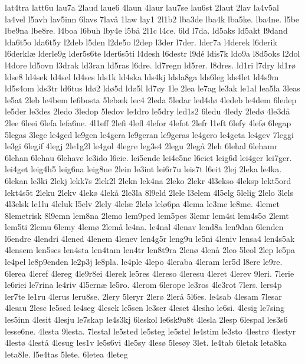 {lat4tra
latt6u
lau7a
2laud
laue6
4laun
4laur
lau7se
lau6st
2laut
2lav
la4v5al
la4vel
l5avh
lav5inn
6lavs
7lav^^e5
1law
lay1
2l1b2
lba3de
lba4k
lba5ke.
lba4ne.
l5be
lbe9na
lbe8re.
l4boa
l6buh
lby4e
l5b^^e5
2l1c
l4ce.
6ld
l7da.
ld5aks
ld5akt
l9dand
lda6t5o
lda6t5y
l2deb
l5den
l2de5o
l2dep
l3der
l7der.
lder7a
l4derek
l6derik
l6derkl^^e6
lderle9g
lder5s6te
lder6s5ti
l4desh
l6destr
l9d^^e9
ldis7k
ldo9a
l8d5oks
l2dol
l4dore
ld5ovn
l3drak
ld3ran
ld5ras
l6dre.
ld7regn
ld5rer.
l8dres.
ld1ri
l7dry
ld1r^^f8
ldse8
ld4sek
ld4sel
ld4ses
lds1k
ld4ska
lds4kj
ldsla8ga
lds6leg
lds4let
ld4s9m
ld5s4om
lds3tr
ld6tus
ld^^f82
ld^^f85d
ld^^f85l
ld7^^f8y
1le
2lea
le7ag
le3ak
le1al
lea5la
3leas
le5at
2leb
le4bem
le6bosta
5leb^^e6k
lec4
2leda
5ledar
led4d^^f8
4ledeb
le4dem
6ledep
le5der
le3des
2ledo
3ledop
5ledov
le4dro
le5dry
led1s2
6ledu
4ledy
2led^^f8
4le3d^^e5
2lee
6leei
6lefa
lefa6ne.
4l1eff
2lefi
4lefl
4lefor
4lefot
2lefr
l1eft
6lefy
4lef^^f8
6legap
5legas
3lege
le4ged
le9gen
le4gera
le9geran
le9geras
le4gero
le4geta
le4gev
7leggi
le3gi
6legif
4legj
2le1g2l
le4gol
4legre
leg3s4
2legu
2leg^^e5
2leh
6lehal
6lehamr
6lehan
6lehau
6lehave
le3ido
l6eie.
lei5ende
lei4e5ne
l6eiet
leig6d
lei4ger
lei7ger.
lei4get
leig4h5
leig6na
leig8ne
2lein
le3int
lei6r7u
leis7t
l6eit
2lej
2leka
le4ka.
6lekan
le3ki
2lekj
lekk7s
2lek2l
2lekn
lek4na
2leko
2lekr
4l3ekso
4leksp
lekt5ord
lekt4s5t
2leku
2lekv
4lek^^f8
4lek^^e5
2le3la
8l9eld
2lele
l3elem
4l5elg
5lelig
2lelo
3lels
4l3elsk
le1lu
4leluk
l5elv
2lely
4lel^^e6
2lel^^f8
lel^^f86pa
4lema
le3me
le8me.
4lemet
8lemetrisk
8l9emn
lem8na
2lemo
lem9ped
lem5pes
3lemr
lem4si
lem4s5^^f8
2lemt
lem5ti
2lemu
6lemy
4lem^^f8
2lem^^e5
le4na.
le4nal
4lenav
lend8a
len9dan
6lenden
l6endre
4lendri
4lened
4lenem
4lenev
len4g5r
leng9u
le5ni
4leniv
lensa4
len4s5ak
4lensem
len5ses
len4sta
len4tam
len4tr
len8t9ra
2len^^f8
4len^^e5
2leo
5leol
2lep
le5pa
le4pel
le8p9enden
le2p3j
le8pla.
le4ple
4lepo
4leraba
4leram
ler5d
l8ere
le9re.
6lerea
4leref
4lereg
4le9r8ei
4lerek
le5res
4lereso
4leresu
4leret
4lerev
9leri.
7lerie
le6riei
le7rina
le4riv
4l5ern^^e6
le5ro.
4lerom
6lerope
le3ros
4le3rot
7lers.
lers4p
ler7te
le1ru
4lerus
leru8se.
2lery
5leryr
2ler^^f8
2ler^^e5
5l6es.
le4sab
4lesam
7lesar
4lesau
2lesc
le5sed
le4seg
4lesek
le5sen
le3ser
4leset
4lesho
le6si.
4lesig
le7sing
les5inn
4lesit
4lesju
le7skap
le4s3kj
6leskol
le6sk9u8t
4lesla
2lesp
6lespal
les3s6
lesse6ne.
4lesta
9lesta.
7lestal
le5sted
le5steg
le5stel
le4stim
le3sto
4lestr^^f8
4lestyr
4lest^^f8
4lest^^e5
4lesug
les1v
le5s6vi
4le5sy
4les^^f8
5les^^f8y
3let.
le4tab
6letak
leta8ka
leta8le.
l5e4tas
5lete.
6letea
4leteg
}
